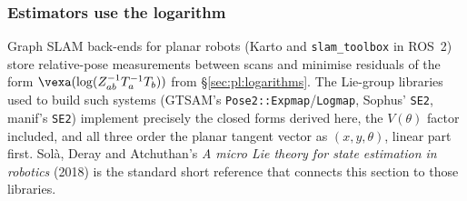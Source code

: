 \subsubsection{Estimators use the logarithm}
Graph SLAM back-ends for planar robots (Karto and \texttt{slam\_toolbox} in ROS~2) store relative-pose measurements between scans and minimise residuals of the form $\vexa(\log(Z_{ab}^{-1}T_a^{-1}T_b))$ from \S\ref{sec:pl:logarithms}. The Lie-group libraries used to build such systems (GTSAM's \texttt{Pose2::Expmap}/\texttt{Logmap}, Sophus' \texttt{SE2}, manif's \texttt{SE2}) implement precisely the closed forms derived here, the $V(\theta)$ factor included, and all three order the planar tangent vector as $(x,y,\theta)$, linear part first. Solà, Deray and Atchuthan's \emph{A micro Lie theory for state estimation in robotics} (2018) is the standard short reference that connects this section to those libraries.
